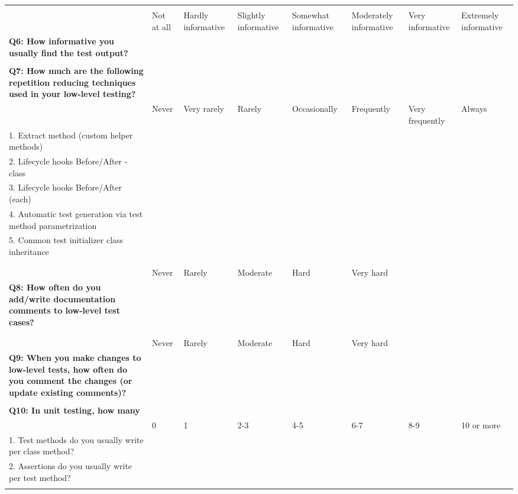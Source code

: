 \begin{table}
{\begin{tabular}{p{20.0cm}*{7}{p{2.0cm}}}
            & & & & & & \\
            & Not at all & Hardly informative & Slightly informative & Somewhat informative & Moderately informative & Very informative & Extremely informative \\
            \textbf{Q6: How informative you usually find the test output?} & \\
            & \\ \hline

            \textbf{Q7: How much are the following repetition reducing techniques used in your low-level testing?} & & & & & & \\
            & Never & Very rarely & Rarely & Occasionally & Frequently & Very \newline frequently & Always \\
            1. Extract method (custom helper methods) & \\
            2. Lifecycle hooks Before/After -class & \\
            3. Lifecycle hooks Before/After (each) & \\
            4. Automatic test generation via test method parametrization & \\
            5. Common test initializer class inheritance & \\
            & \\ \hline

            & & & & & & \\
            & Never & Rarely & Moderate & Hard & Very hard & & \\
            \textbf{Q8: How often do you add/write documentation comments to low-level test cases?} & \\
            & \\ \hline

            & & & & & & \\
            & Never & Rarely & Moderate & Hard & Very hard & & \\
            \textbf{Q9: When you make changes to low-level tests, how often do you comment the changes (or update existing comments)?} & \\
            & \\ \hline

            \textbf{Q10: In unit testing, how many} & & & & & & \\
            & 0 & 1 & 2-3 & 4-5 & 6-7 &  8-9 & 10 or more \\
            1. Test methods do you usually write per class method? & \\
            2. Assertions do you usually write per test method? & \\
            & \\ \hline


\end{tabular}}
\end{table}
